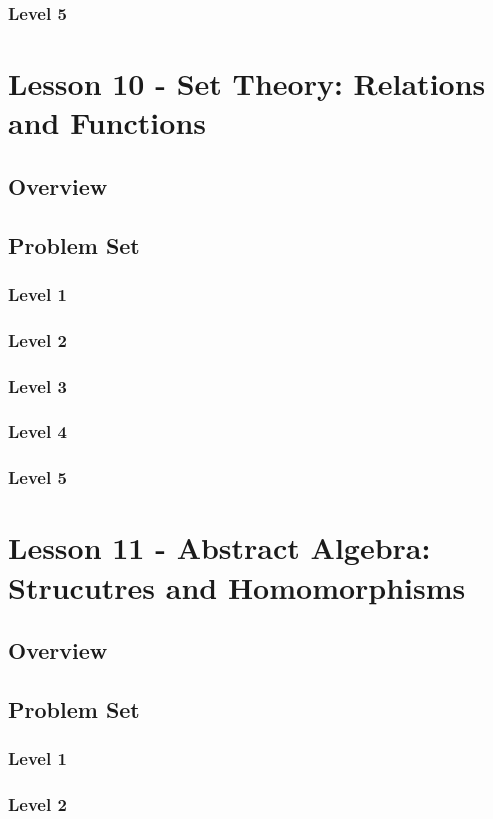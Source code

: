 \documentclass{article}
\begin{document}
\subsubsection{Level 5}
\pagebreak

\section{Lesson 10 - Set Theory: Relations and Functions}
\subsection{Overview}
\subsection{Problem Set}
\subsubsection{Level 1}
\subsubsection{Level 2}
\subsubsection{Level 3}
\subsubsection{Level 4}
\subsubsection{Level 5}
\pagebreak

\section{Lesson 11 - Abstract Algebra: Strucutres and Homomorphisms}
\subsection{Overview}
\subsection{Problem Set}
\subsubsection{Level 1}
\subsubsection{Level 2}
\end{document}
